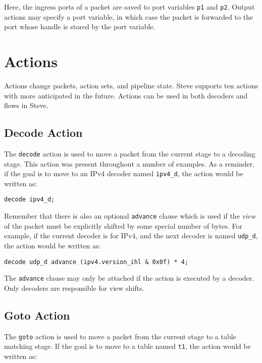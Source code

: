 Here, the ingress ports of a packet are saved to port variables \texttt{p1} and \texttt{p2}. Output actions may specify a port variable, in which case the packet is forwarded to the port whose handle is stored by the port variable.

\section{Actions} \label{tut:action}

Actions change packets, action sets, and pipeline state. Steve supports ten
actions with more anticipated in the future. Actions can be used in both
decoders and flows in Steve.

\subsection{Decode Action} \label{tut:decode_action}

The \texttt{decode} action is used to move a packet from the current stage to a
decoding stage. This action was present throughout a number of examples. As a
reminder, if the goal is to move to an IPv4 decoder named \texttt{ipv4\_d}, the
action would be written as:

\begin{lstlisting}
decode ipv4_d;
\end{lstlisting}

Remember that there is also an optional \texttt{advance} clause which is used if
the \textit{view} of the packet must be explicitly shifted by some special
number of bytes. For example, if the current decoder is for IPv4, and the next
decoder is named \texttt{udp\_d}, the action would be written as:

\begin{lstlisting}
decode udp_d advance (ipv4.version_ihl & 0x0f) * 4;
\end{lstlisting}

The \texttt{advance} clause may only be attached if the action is executed by a
decoder. Only decoders are responsible for view shifts.

\subsection{Goto Action} \label{tut:goto_action}

The \texttt{goto} action is used to move a packet from the current stage to a
table matching stage. If the goal is to move to a table named \texttt{t1}, the
action would be written as:

